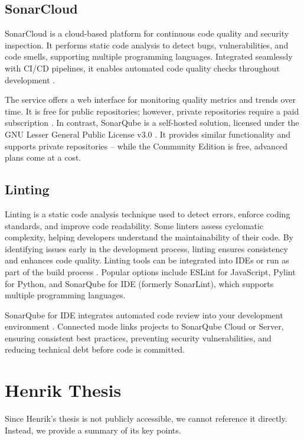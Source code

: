 \subsection{SonarCloud}
SonarCloud is a cloud-based platform for continuous code quality and security inspection. It performs static code analysis to detect bugs, vulnerabilities, and code smells, supporting multiple programming languages. Integrated seamlessly with CI/CD pipelines, it enables automated code quality checks throughout development \Parencite{SonarQubeDocs2025}.

The service offers a web interface for monitoring quality metrics and trends over time. It is free for public repositories; however, private repositories require a paid subscription \Parencite{SonarCloudPricing2025}. In contrast, SonarQube is a self-hosted solution, licensed under the GNU Lesser General Public License v3.0 \Parencite{SonarQubeLicense2025}. It provides similar functionality and supports private repositories -- while the Community Edition is free, advanced plans come at a cost.

\subsection{Linting}
Linting is a static code analysis technique used to detect errors, enforce coding standards, and improve code readability. Some linters assess cyclomatic complexity, helping developers understand the maintainability of their code. By identifying issues early in the development process, linting ensures consistency and enhances code quality. Linting tools can be integrated into IDEs or run as part of the build process \Parencite{SuperLinter2025}. Popular options include ESLint for JavaScript, Pylint for Python, and SonarQube for IDE (formerly SonarLint), which supports multiple programming languages.

SonarQube for IDE integrates automated code review into your development environment \Parencite{SonarQubeConnectedMode2025}. Connected mode links projects to SonarQube Cloud or Server, ensuring consistent best practices, preventing security vulnerabilities, and reducing technical debt before code is committed.

\section{Henrik Thesis}\label{sec:henrik_thesis}
Since Henrik's thesis is not publicly accessible, we cannot reference it directly. Instead, we provide a summary of its key points.

